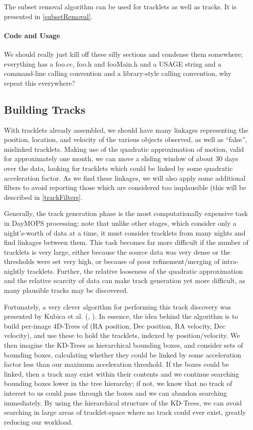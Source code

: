 The subset removal algorithm can be used for tracklets as well as
tracks.  It is presented in \ref{subsetRemoval}.


\paragraph{Code and Usage}
We should really just kill off these silly sections and condense them
somewhere; everything has a foo.cc, foo.h and fooMain.h and a USAGE
string and a command-line calling convention and a library-style
calling convention, why repeat this everywhere?



\subsection{Building Tracks}

With tracklets already assembled, we should have many linkages
representing the position, location, and velocity of the various
objects observed, as well as ``false'', mislinked tracklets.  Making
use of the quadratic approximation of motion, valid for approximately
one month, we can move a sliding window of about 30 days over the
data, looking for tracklets which could be linked by some quadratic
acceleration factor.  As we find these linkages, we will also apply
some additional filters to avoid reporting those which are considered
too implausible (this will be described in \ref{trackFilters}.

Generally, the track generation phase is the most computationally
expensive task in DayMOPS processing; note that unlike other stages,
which consider only a night's-worth of data at a time, it must
consider tracklets from many nights and find linkages between them.
This task becomes far more difficult if the number of tracklets is
very large, either because the source data was very dense or the
thresholds were set very high, or because of poor refinement/merging
of intra-nightly tracklets.  Further, the relative looseness of the
quadratic approximation and the relative scarcity of data can make
track generation yet more difficult, as many plausible tracks may be
discovered.

Fortunately, a very clever algorithm for performing this track
discovery was presented by Kubica et al. (\citet{kubica_thesis},
\citet{Kubica:2005:MTA:1081870.1081889}).  In essence, the idea behind
the algorithm is to build per-image 4D-Trees of (RA position, Dec
position, RA velocity, Dec velocity), and use these to hold the
tracklets, indexed by position/velocity.  We then imagine the KD-Trees
as hierarchical bounding boxes, and consider sets of bounding boxes,
calculating whether they could be linked by some acceleration factor
less than our maximum acceleration threshold.  If the boxes could be
linked, then a track may exist within their contents and we continue
searching bounding boxes lower in the tree hierarchy; if not, we know
that no track of interest to us could pass through the boxes and we
can abandon searching immediately.  By using the hierarchical
structure of the KD-Trees, we can avoid searching in large areas of
tracklet-space where no track could ever exist, greatly reducing our
workload.


